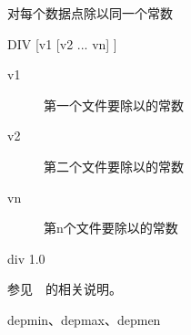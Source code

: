 \label{cmd:div}

对每个数据点除以同一个常数

\begin{SACSTX}
DIV [v1 [v2 ... vn] ]
\end{SACSTX}

\begin{description}
\item [v1] 第一个文件要除以的常数
\item [v2] 第二个文件要除以的常数
\item [vn] 第n个文件要除以的常数
\end{description}

\begin{SACDFT}
div 1.0
\end{SACDFT}

参见~~的相关说明。

depmin、depmax、depmen
